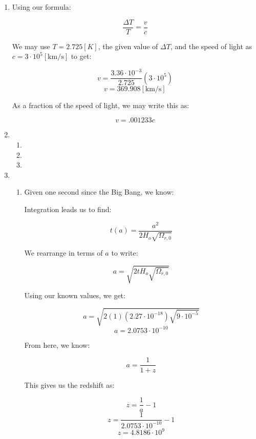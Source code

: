 \begin{enumerate}

  \item Using our formula:

    $$\frac{\Delta T}{T}=\frac{v}{c}$$

    We may use $T=2.725[\si{K}]$, the given value of $\Delta T$, and the speed of light as $c=3\cdot10^5[\si{\km\per\second}]$ to get:

    $$v=\frac{3.36\cdot10^{-3}}{2.725}(3\cdot10^5)$$
    $$\boxed{v=369.908[\si{\kilo\meter\per\second}]}$$

    As a fraction of the speed of light, we may write this as:

    $$\boxed{v=.001233c}$$

  \item

    \begin{enumerate}

      \item 

      \item 

      \item 

    \end{enumerate}

  \item

    \begin{enumerate}

      \item Given one second since the Big Bang, we know:

        Integration leads us to find:

        $$t(a)=\frac{a^2}{2H_o\sqrt{\Omega_{r,0}}}$$

        We rearrange in terms of $a$ to write:

        $$a=\sqrt{2tH_o\sqrt{\Omega_{r,0}}}$$
        
        Using our known values, we get:

        $$a=\sqrt{2(1)\left(2.27\cdot10^{-18}\right)\sqrt{9\cdot10^{-5}}}$$
        $$\boxed{a=2.0753\cdot10^{-10}}$$

        From here, we know:

        $$a=\frac{1}{1+z}$$

        This gives us the redshift as:

        $$z=\frac{1}{a}-1$$
        $$z=\frac{1}{2.0753\cdot10^{-10}}-1$$
        $$\boxed{z=4.8186\cdot10^{9}}$$


\end{enumerate}
\end{enumerate}

